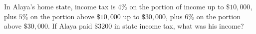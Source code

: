 In Alaya's home state, income tax is $4\%$ on the portion of income up to $\$10{,}000$, plus $5\%$ on the portion above $\$10{,}000$ up to $\$30{,}000$, plus $6\%$ on the portion above $\$30{,}000$. If Alaya paid $\$3200$ in state income tax, what was his income?
